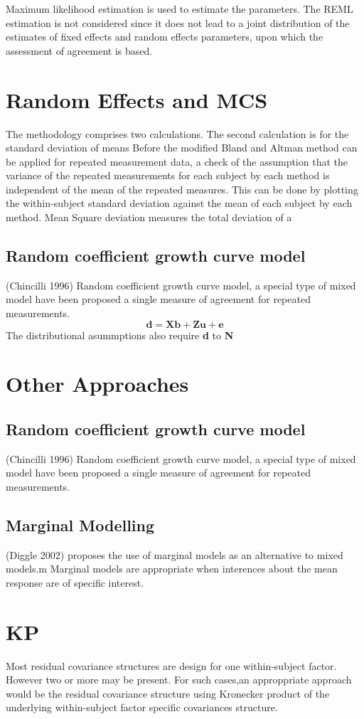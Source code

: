 \documentclass[12pt, a4paper]{report}
\theoremstyle{plain}
\theoremstyle{definition}
\theoremstyle{remark}
\begin{document}
Maximum likelihood estimation is used to estimate the parameters.
The REML estimation is not considered since it does not lead to a
joint distribution of the estimates of fixed effects and random
effects parameters, upon which the assessment of agreement is
based.

\section{Random Effects and MCS}
The methodology comprises two calculations. The second calculation
is for the standard deviation of means Before the modified Bland
and Altman method can be applied for repeated measurement data, a
check of the assumption that the variance of the repeated
measurements for each subject by each method is independent of the
mean of the repeated measures. This can be done by plotting the
within-subject standard deviation against the mean of each subject
by each method. Mean Square deviation measures the total deviation
of a


\subsection{Random coefficient growth curve model} (Chincilli
1996) Random coefficient growth curve model, a special type of
mixed model have been proposed a single measure of agreement for
repeated measurements.
\begin{equation}
\textbf{d}= \textbf{Xb} + \textbf{Zu} + \textbf{e}
\end{equation}
The distributional asummptions also require \textbf{d} to
\textbf{N}

\newpage
\section{Other Approaches}

\subsection{Random coefficient growth curve model} (Chincilli
1996) Random coefficient growth curve model, a special type of
mixed model have been proposed  a single measure of agreement for
repeated measurements.
\subsection{Marginal Modelling}
(Diggle 2002) proposes the use of marginal models as an
alternative to mixed models.m Marginal models are appropriate when
interences about the mean response are of specific interest.
\section{KP}
Most residual covariance structures are design for one
within-subject factor. However two or more may be present. For
such cases,an approppriate approach would be the residual
covariance structure using Kronecker product of the underlying
within-subject factor specific covariances structure.
\end{document}
